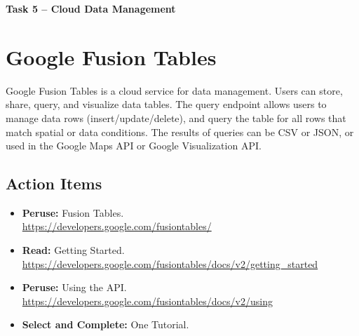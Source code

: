 \documentclass[11pt]{article}
\begin{document}
\begin{center}
{\bfseries \LARGE Task 5 -- Cloud Data Management}
\end{center}


\section{Google Fusion Tables}

Google Fusion Tables is a cloud service for data management.
Users can store, share, query, and visualize data tables.
The query endpoint allows users to manage data rows (insert/update/delete), and query the table for all rows that match spatial or data conditions.
The results of queries can be CSV or JSON, or used in the Google Maps API or Google Visualization API.

\subsection*{Action Items}

\begin{itemize}
\item \textbf{Peruse:} Fusion Tables.\\
\url{https://developers.google.com/fusiontables/}
\item \textbf{Read:} Getting Started.\\
\url{https://developers.google.com/fusiontables/docs/v2/getting_started}
\item \textbf{Peruse:} Using the API.\\
\url{https://developers.google.com/fusiontables/docs/v2/using}
\item \textbf{Select and Complete:} One Tutorial.
\end{itemize}
\end{document}
